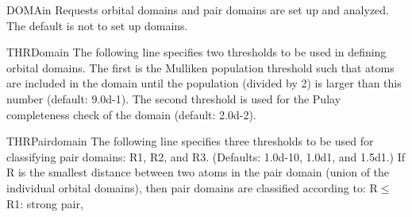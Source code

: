 \begin{keywordlist}
\item[DOMAin]
Requests orbital domains and pair domains are set up and analyzed.
The default is not to set up domains.
\item[THRDomain]
The following line specifies two thresholds to be used in defining
orbital domains. The first is the Mulliken population threshold
such that atoms are included in the domain until the population
(divided by 2) is larger than this number (default: 9.0d-1).
The second threshold is used for the Pulay completeness check of
the domain (default: 2.0d-2).
\item[THRPairdomain]
The following line specifies three thresholds to be used for
classifying pair domains: R1, R2, and R3. (Defaults: 1.0d-10,
1.0d1, and 1.5d1.)
If R is the smallest distance
between two atoms in the pair domain (union of the individual orbital
domains), then pair domains are classified according to:
R$\leq$R1: strong pair,

\end{keywordlist}
